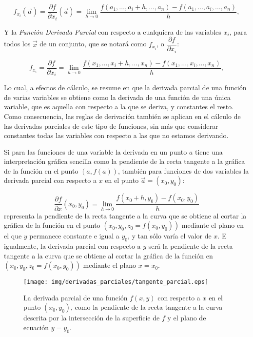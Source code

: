 \[
f_{x_i}(\vec{a})=\dfrac{\partial f}{\partial
x_i}(\vec{a})=\lim_{h\rightarrow
0}\frac{f(a_1,\ldots,a_i+h,\ldots,a_n)-f(a_1,\ldots,a_i,\ldots,a_n)}{h},
\]


Y la \emph{Función Derivada Parcial} con respecto a cualquiera de
las variables $x_i$, para todos los $\vec{x}$ de un conjunto, que se
notará como $f_{x_i}$, o $\dfrac{\partial f}{\partial x_i}$:

\[
f_{x_i}=\dfrac{\partial f}{\partial x_i}=\lim_{h\rightarrow
0}\frac{f(x_1,\ldots,x_i+h,\ldots,x_n)-f(x_1,\ldots,x_i,\ldots,x_n)}{h},
\]

Lo cual, a efectos de cálculo, se resume en que la derivada parcial
de una función de varias variables se obtiene como la derivada de
una función de una única variable, que es aquella con respecto a la
que se deriva, y constantes el resto. Como consecuencia, las reglas
de derivación también se aplican en el cálculo de las derivadas
parciales de este tipo de funciones, sin más que considerar
constantes todas las variables con respecto a las que no estamos
derivando.

Si para las funciones de una variable la derivada en un punto $a$
tiene una interpretación gráfica sencilla como la pendiente de la
recta tangente a la gráfica de la función en el punto $(a,f(a))$,
también para funciones de dos variables la derivada parcial con
respecto a $x$ en el punto $\vec{a}=(x_0,y_0)$:

\[
\frac{{\partial f}} {{\partial x}}(x_0 ,y_0 ) = \mathop {\lim
}\limits_{h \to 0} \frac{{f(x_0  + h,y_0 ) - f(x_0 ,y_0 )}} {h}
\]
representa la pendiente de la recta tangente a la curva que se
obtiene al cortar la gráfica de la función en el punto
$(x_0,y_0,z_0=f(x_0,y_0))$ mediante el plano en el que $y$ permanece
constante e igual a $y_0$, y tan sólo varía el valor de $x$. E
igualmente, la derivada parcial con respecto a $y$ será la pendiente
de la recta tangente a la curva que se obtiene al cortar la gráfica
de la función en $(x_0,y_0,z_0=f(x_0,y_0))$ mediante el plano
$x=x_0$.

\begin{figure}[h!]
\begin{center}
\texttt{[image: img/derivadas\_parciales/tangente\_parcial.eps]}
\caption{La derivada parcial de una función $f(x,y)$ con respecto a
$x$ en el punto $(x_0,y_0)$, como la pendiente de la recta tangente
a la curva descrita por la intersección de la superficie de $f$ y el
plano de ecuación $y=y_0$.}
\end{center}
\end{figure}


